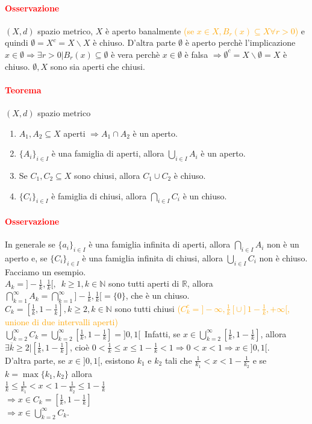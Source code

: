 \documentclass{article}
\newcommand{\R}{\mathbb{R}}
\newcommand{\N}{\mathbb{N}}
\begin{document}
\paragraph{\textcolor{red}{Osservazione}}
$(X,d)$ spazio metrico, $X$ è aperto banalmente \textcolor{orange}{(se $x\in X, B_r(x) \subseteq X \forall r>0$)} e quindi $\emptyset = X^c = X \backslash X$ è chiuso. D'altra parte $\emptyset $ è aperto perchè l'implicazione $x \in \emptyset \Rightarrow \exists r >0 | B_r(x) \subseteq \emptyset$ è vera perchè $x \in \emptyset$  è falsa $\Rightarrow \emptyset^c=X \backslash \emptyset = X$ è chiuso. $\emptyset, X$ sono sia aperti che chiusi.

\paragraph{\textcolor{red}{Teorema}}
$(X,d)$ spazio metrico
\begin{enumerate}
    \item $A_1,A_2 \subseteq X$ aperti $\Rightarrow A_1 \cap A_2$ è un aperto. 
    \item $\{A_i\}_{i\in I}$ è una famiglia di aperti, allora $\bigcup_{i\in I}A_i$ è un aperto.
    \item Se $C_1,C_2 \subseteq X$ sono chiusi, allora $C_1 \cup C_2$ è chiuso.
    \item $\{C_i\}_{i\in I}$ è famiglia di chiusi, allora $\bigcap_{i\in I} C_i$ è un chiuso.
\end{enumerate}

\paragraph{\textcolor{red}{Osservazione}}
In generale se $\{ a_i\}_{i\in I}$ è una famiglia infinita di aperti, allora $\bigcap_{i\in I} A_i$ non è un aperto e, se $\{C_i\}_{i \in I}$ è una famiglia infinita di chiusi, allora $\bigcup_{i\in I} C_i$ non è chiuso. Facciamo un esempio.\\
$A_k=]-\frac{1}{k},\frac{1}{k}[,\,\,\, k \geq 1, k \in \N$ sono tutti aperti di $\R$, allora $\bigcap_{k=1}^\infty A_k = \bigcap_{k=1}^\infty ]-\frac{1}{k},\frac{1}{k}[=\{0\}$, che è un chiuso.\\
$C_k=[\frac{1}{k},1-\frac{1}{k}], k \geq 2, k \in \N$ sono tutti chiusi \textcolor{orange}{($C_k^c=]-\infty,\frac{1}{k}[\cup]1-\frac{1}{k},+\infty[$, unione di due intervalli aperti)}\\
$\bigcup_{k=2}^\infty C_k = \bigcup_{k=2}^\infty \left[\frac{1}{k},1-\frac{1}{k}\right]=]0,1[$\
Infatti, se $x \in \bigcup_{k=2}^\infty [\frac{1}{k},1-\frac{1}{k}]$, allora $\exists \overline{k} \geq 2 | \left[\frac{1}{k},1-\frac{1}{k}\right]$, cioè $0<\frac{1}{k}\leq x \leq 1- \frac{1}{k}< 1 \Rightarrow 0<x<1 \Rightarrow x \in ]0,1[.$\\
D'altra parte, se $x \in ]0,1[$, esistono $k_1$ e $k_2$ tali che $\frac{1}{k_1}<x<1-\frac{1}{k_2}$ e se $k=\max\{k_1,k_2\}$ allora\\
$\frac{1}{k}\leq \frac{1}{k_1} <x<1-\frac{1}{k_2}\leq 1-\frac{1}{k}$\\
$\Rightarrow x\in C_k =[\frac{1}{k},1-\frac{1}{k}]$\\
$\Rightarrow x\in \bigcup_{k=2}^{\infty} C_k$.
\end{document}
